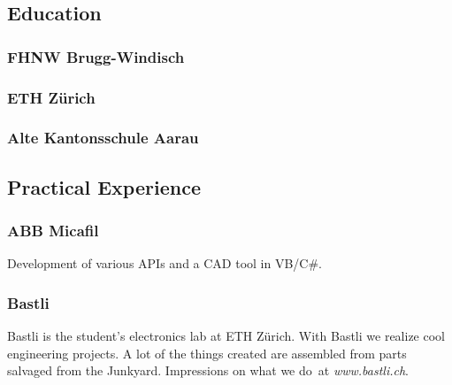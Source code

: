 \documentclass[]{resume}
\begin{document}
\begin{timeline}


\subsection{Education}

\subsubsection{FHNW Brugg-Windisch}
\sectionsep

\subsubsection{ETH Zürich}
\sectionsep

\subsubsection{Alte Kantonsschule Aarau}
\sectionsep


\subsection{Practical Experience}

\subsubsection{ABB Micafil}
Development of various APIs and a CAD tool in VB/C\#.
\sectionsep

\subsubsection{Bastli}
Bastli is the student's electronics lab at ETH Zürich.
With Bastli we realize cool engineering projects. A lot of the things created are assembled from parts salvaged from the Junkyard.
Impressions on what we do at \textit{www.bastli.ch}.
\sectionsep


\end{timeline}
\end{document}
